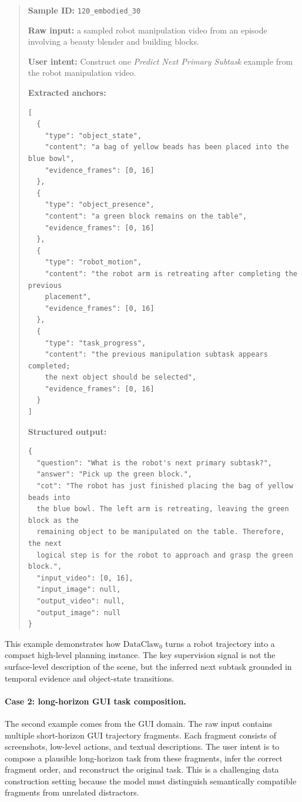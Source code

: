 \documentclass{llmxive}
\begin{document}
\begin{quote}
\small
\textbf{Sample ID:} \texttt{120\_embodied\_30}

\textbf{Raw input:} a sampled robot manipulation video from an episode involving a beauty blender and building blocks.

\textbf{User intent:} Construct one \emph{Predict Next Primary Subtask} example from the robot manipulation video.

\textbf{Extracted anchors:}
\begin{verbatim}
[
  {
    "type": "object_state",
    "content": "a bag of yellow beads has been placed into the blue bowl",
    "evidence_frames": [0, 16]
  },
  {
    "type": "object_presence",
    "content": "a green block remains on the table",
    "evidence_frames": [0, 16]
  },
  {
    "type": "robot_motion",
    "content": "the robot arm is retreating after completing the previous
    placement",
    "evidence_frames": [0, 16]
  },
  {
    "type": "task_progress",
    "content": "the previous manipulation subtask appears completed;
    the next object should be selected",
    "evidence_frames": [0, 16]
  }
]
\end{verbatim}

\textbf{Structured output:}
\begin{verbatim}
{
  "question": "What is the robot's next primary subtask?",
  "answer": "Pick up the green block.",
  "cot": "The robot has just finished placing the bag of yellow beads into
  the blue bowl. The left arm is retreating, leaving the green block as the
  remaining object to be manipulated on the table. Therefore, the next
  logical step is for the robot to approach and grasp the green block.",
  "input_video": [0, 16],
  "input_image": null,
  "output_video": null,
  "output_image": null
}
\end{verbatim}
\end{quote}

This example demonstrates how $\text{DataClaw}_0$ turns a robot trajectory into a compact high-level planning instance. The key supervision signal is not the surface-level description of the scene, but the inferred next subtask grounded in temporal evidence and object-state transitions.

\paragraph{Case 2: long-horizon GUI task composition.}
The second example comes from the GUI domain. The raw input contains multiple short-horizon GUI trajectory fragments. Each fragment consists of screenshots, low-level actions, and textual descriptions. The user intent is to compose a plausible long-horizon task from these fragments, infer the correct fragment order, and reconstruct the original task. This is a challenging data construction setting because the model must distinguish semantically compatible fragments from unrelated distractors.
\end{document}
